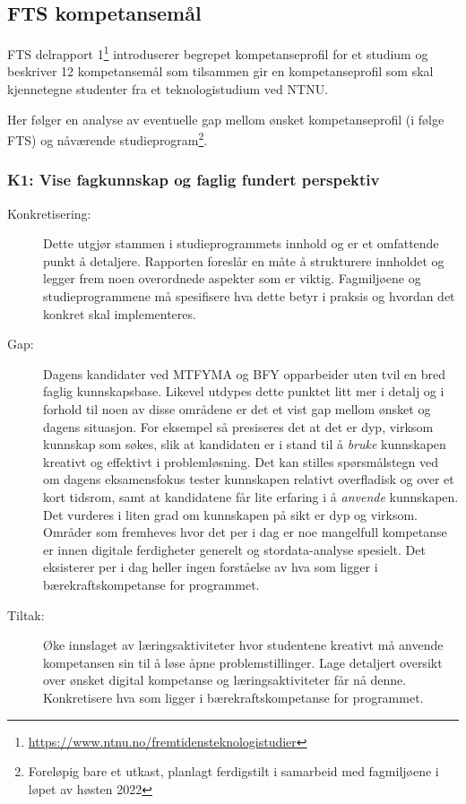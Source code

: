 \subsection{FTS kompetansemål}
\label{sec:fts-competencies}
FTS delrapport 1\footnote{\url{https://www.ntnu.no/fremtidensteknologistudier}} introduserer begrepet kompetanseprofil for et studium og beskriver 12 kompetansemål som tilsammen gir en kompetanseprofil som skal kjennetegne studenter fra et teknologistudium ved NTNU.

Her følger en analyse av eventuelle gap mellom ønsket kompetanseprofil (i følge FTS) og nåværende studieprogram\footnote{Foreløpig bare et utkast, planlagt ferdigstilt i samarbeid med fagmiljøene i løpet av høsten 2022}.

\subsubsection{K1: Vise fagkunnskap og faglig fundert perspektiv}
\begin{description}
\item[Konkretisering:] Dette utgjør stammen i studieprogrammets innhold og er et omfattende punkt å detaljere. Rapporten foreslår en måte å strukturere innholdet og legger frem noen overordnede aspekter som er viktig. Fagmiljøene og studieprogrammene må spesifisere hva dette betyr i praksis og hvordan det konkret skal implementeres.
\item[Gap:] Dagens kandidater ved MTFYMA og BFY opparbeider uten tvil en bred faglig kunnskapsbase. Likevel utdypes dette punktet litt mer i detalj og i forhold til noen av disse områdene er det et vist gap mellom ønsket og dagens situasjon. For eksempel så presiseres det at det er dyp, virksom kunnskap som søkes, slik at kandidaten er i stand til å \emph{bruke} kunnskapen kreativt og effektivt i problemløsning. Det kan stilles spørsmålstegn ved om dagens eksamensfokus tester kunnskapen relativt overfladisk og over et kort tidsrom, samt at kandidatene får lite erfaring i å \emph{anvende} kunnskapen. Det vurderes i liten grad om kunnskapen på sikt er dyp og virksom. Områder som fremheves hvor det per i dag er noe mangelfull kompetanse er innen digitale ferdigheter generelt og stordata-analyse spesielt. Det eksisterer per i dag heller ingen forståelse av hva som ligger i bærekraftskompetanse for programmet.
\item[Tiltak:] Øke innslaget av læringsaktiviteter hvor studentene kreativt må anvende kompetansen sin til å løse åpne problemstillinger. Lage detaljert oversikt over ønsket digital kompetanse og læringsaktiviteter får nå denne. Konkretisere hva som ligger i bærekraftskompetanse for programmet.
\end{description}

